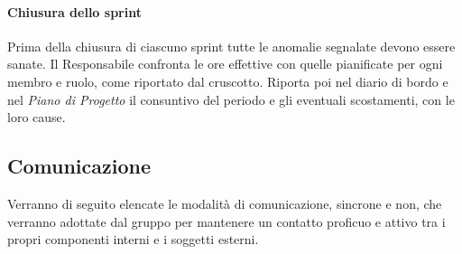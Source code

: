 \documentclass[documento]{gpt}
\begin{document}
	\paragraph{Chiusura dello sprint}
	Prima della chiusura di ciascuno sprint tutte le anomalie segnalate devono essere sanate. Il Responsabile confronta le ore effettive con quelle pianificate per ogni membro e ruolo, come riportato dal cruscotto. Riporta poi nel diario di bordo e nel \textit{Piano di Progetto} il consuntivo del periodo e gli eventuali scostamenti, con le loro cause.

	\clearpage
	\subsection{Comunicazione}
	Verranno di seguito elencate le modalità di comunicazione, sincrone e non, che verranno adottate dal gruppo per mantenere un contatto proficuo e attivo tra i propri componenti interni e i soggetti esterni.
\end{document}
